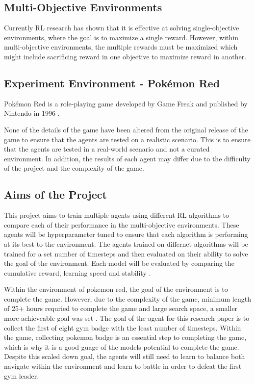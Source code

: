\subsection{Multi-Objective Environments}
Currently RL research has shown that it is effective at solving single-objective environments, where the goal is to maximize a single reward. However, within multi-objective environments, the multiple rewards must be maximized which might include sacrificing reward in one objective to maximize reward in another.  

\subsection{Experiment Environment - Pokémon Red}
Pokémon Red is a role-playing game developed by Game Freak and published by Nintendo in 1996 \cite{HubZ_1998}. 

None of the details of the game have been altered from the original release of the game to ensure that the agents are tested on a realistic scenario. This is to ensure that the agents are tested in a real-world scenario and not a curated environment. In addition, the results of each agent may differ due to the difficulty of the project and the complexity of the game.  

\subsection{Aims of the Project}

This project aims to train multiple agents using different RL algorithms to compare each of their performance in the multi-objective environments. These agents will be hyperparameter tuned to ensure that each algorithm is performing at its best to the environment. The agents trained on differnet algorithms will be trained for a set number of timesteps and then evaluated on their ability to solve the goal of the environment. Each model will be evaluated by comparing the cumulative reward, learning speed and stability \cite{Sutton1}. 

Within the environment of pokemon red, the goal of the environment is to complete the game. However, due to the complexity of the game, minimum length of 25+ hours requried to complete the game and large search space, a smaller more achieveable goal was set \cite{howlongtobeat}. The goal of the agent for this research paper is to collect the first of eight gym badge with the least number of timesteps. Within the game, collecting pokemon badge is an essential step to completing the game, which is why it is a good guage of the models potential to complete the game. Despite this scaled down goal, the agents will still need to learn to balance both navigate within the environment and learn to battle in order to defeat the first gym leader.